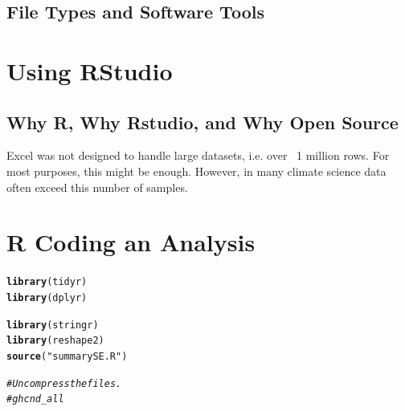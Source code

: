 \documentclass{article}\usepackage[]{graphicx}\usepackage[]{color}
\makeatletter
\newcommand{\hlstr}[1]{\textcolor[rgb]{0.192,0.494,0.8}{#1}}%
\newcommand{\hlcom}[1]{\textcolor[rgb]{0.678,0.584,0.686}{\textit{#1}}}%
\newcommand{\hlstd}[1]{\textcolor[rgb]{0.345,0.345,0.345}{#1}}%
\newcommand{\hlkwd}[1]{\textcolor[rgb]{0.737,0.353,0.396}{\textbf{#1}}}%
\newenvironment{kframe}{%
 \def\at@end@of@kframe{}%
 \ifinner\ifhmode%
  \def\at@end@of@kframe{\end{minipage}}%
  \begin{minipage}{\columnwidth}%
 \fi\fi%
 \def\FrameCommand##1{\hskip\@totalleftmargin \hskip-\fboxsep
 \colorbox{shadecolor}{##1}\hskip-\fboxsep
     \hskip-\linewidth \hskip-\@totalleftmargin \hskip\columnwidth}%
 \MakeFramed {\advance\hsize-\width
   \@totalleftmargin\z@ \linewidth\hsize
   \@setminipage}}%
 {\par\unskip\endMakeFramed%
 \at@end@of@kframe}
\newenvironment{knitrout}{}{} %
\makeatother
\begin{document}
\subsection{File Types and Software Tools}


\section{Using RStudio}

\subsection{Why R, Why Rstudio, and Why Open Source}

Excel was not designed to handle large datasets, i.e. over ~1 million rows. For most purposes, this might be enough. However, in many climate science data often exceed this number of samples. 

\section{R Coding an Analysis}


\begin{knitrout}
\color{fgcolor}\begin{kframe}
\begin{alltt}
\hlkwd{library}\hlstd{(tidyr)}
\hlkwd{library}\hlstd{(dplyr)}
\end{alltt}


{\ttfamily\noindent\itshape\color{messagecolor}{\#\# \\\#\# Attaching package: 'dplyr'\\\#\# \\\#\# The following objects are masked from 'package:stats':\\\#\# \\\#\#\ \ \ \  filter, lag\\\#\# \\\#\# The following objects are masked from 'package:base':\\\#\# \\\#\#\ \ \ \  intersect, setdiff, setequal, union}}\begin{alltt}
\hlkwd{library}\hlstd{(stringr)}
\hlkwd{library}\hlstd{(reshape2)}
\hlkwd{source}\hlstd{(}\hlstr{"summarySE.R"}\hlstd{)}
\end{alltt}
\end{kframe}
\end{knitrout}
\begin{knitrout}
\color{fgcolor}\begin{kframe}
\begin{alltt}
\hlcom{# Uncompress the files.}
\hlcom{# ghcnd_all}
\end{alltt}
\end{kframe}
\end{knitrout}
\end{document}
